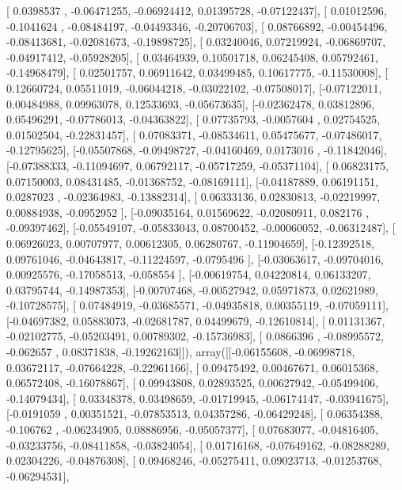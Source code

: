 \documentclass{article}
\begin{document}
       [ 0.0398537 , -0.06471255, -0.06924412,  0.01395728, -0.07122437],
       [ 0.01012596, -0.1041624 , -0.08484197, -0.04493346, -0.20706703],
       [ 0.08766892, -0.00454496, -0.08413681, -0.02081673, -0.19898725],
       [ 0.03240046,  0.07219924, -0.06869707, -0.04917412, -0.05928205],
       [ 0.03464939,  0.10501718,  0.06245408,  0.05792461, -0.14968479],
       [ 0.02501757,  0.06911642,  0.03499485,  0.10617775, -0.11530008],
       [ 0.12660724,  0.05511019, -0.06044218, -0.03022102, -0.07508017],
       [-0.07122011,  0.00484988,  0.09963078,  0.12533693, -0.05673635],
       [-0.02362478,  0.03812896,  0.05496291, -0.07786013, -0.04363822],
       [ 0.07735793, -0.0057604 ,  0.02754525,  0.01502504, -0.22831457],
       [ 0.07083371, -0.08534611,  0.05475677, -0.07486017, -0.12795625],
       [-0.05507868, -0.09498727, -0.04160469,  0.0173016 , -0.11842046],
       [-0.07388333, -0.11094697,  0.06792117, -0.05717259, -0.05371104],
       [ 0.06823175,  0.07150003,  0.08431485, -0.01368752, -0.08169111],
       [-0.04187889,  0.06191151,  0.0287023 , -0.02364983, -0.13882314],
       [ 0.06333136,  0.02830813, -0.02219997,  0.00884938, -0.0952952 ],
       [-0.09035164,  0.01569622, -0.02080911,  0.082176  , -0.09397462],
       [-0.05549107, -0.05833043,  0.08700452, -0.00060052, -0.06312487],
       [ 0.06926023,  0.00707977,  0.00612305,  0.06280767, -0.11904659],
       [-0.12392518,  0.09761046, -0.04643817, -0.11224597, -0.0795496 ],
       [-0.03063617, -0.09704016,  0.00925576, -0.17058513, -0.058554  ],
       [-0.00619754,  0.04220814,  0.06133207,  0.03795744, -0.14987353],
       [-0.00707468, -0.00527942,  0.05971873,  0.02621989, -0.10728575],
       [ 0.07484919, -0.03685571, -0.04935818,  0.00355119, -0.07059111],
       [-0.04697382,  0.05883073, -0.02681787,  0.04499679, -0.12610814],
       [ 0.01131367, -0.02102775, -0.05203491,  0.00789302, -0.15736983],
       [ 0.0866396 , -0.08995572, -0.062657  ,  0.08371838, -0.19262163]]), array([[-0.06155608, -0.06998718,  0.03672117, -0.07664228, -0.22961166],
       [ 0.09475492,  0.00467671,  0.06015368,  0.06572408, -0.16078867],
       [ 0.09943808,  0.02893525,  0.00627942, -0.05499406, -0.14079434],
       [ 0.03348378,  0.03498659, -0.01719945, -0.06174147, -0.03941675],
       [-0.0191059 ,  0.00351521, -0.07853513,  0.04357286, -0.06429248],
       [ 0.06354388, -0.106762  , -0.06234905,  0.08886956, -0.05057377],
       [ 0.07683077, -0.04816405, -0.03233756, -0.08411858, -0.03824054],
       [ 0.01716168, -0.07649162, -0.08288289,  0.02304226, -0.04876308],
       [ 0.09468246, -0.05275411,  0.09023713, -0.01253768, -0.06294531],
\end{document}
